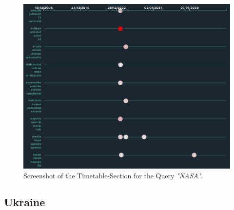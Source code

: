 \documentclass[12pt,oneside,bibtotoc,liststotoc]{scrbook}
\begin{document}
\begin{figure}[H]
\centering
\includegraphics[width=\linewidth]{img/nasa.png}
\caption{Screenshot of the Timetable-Section for the Query \textit{"NASA"}.}
\label{fig:results_nasa}
\end{figure}

\subsection{Ukraine}
\end{document}
